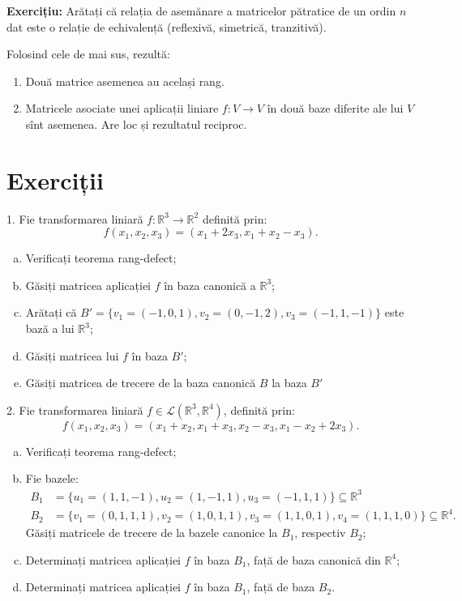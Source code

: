 \documentclass[11pt,a4paper]{article}
\newcommand\kal{\mathcal}
\newcommand\seq{\subseteq}
\newcommand\RR{\mathbb{R}}
\theoremstyle{dotless}
\theoremstyle{dotlessdr}
\begin{document}
\textbf{Exercițiu:} Arătați că relația de asemănare a matricelor pătratice
de un ordin $n$ dat este o relație de echivalență (reflexivă, simetrică, tranzitivă).

\vspace{.3cm}

Folosind cele de mai sus, rezultă:
\begin{enumerate}[(1)]
\item Două matrice asemenea au același rang.
\item Matricele asociate unei aplicații liniare $f : V \to V$ în două baze
  diferite ale lui $V$ sînt asemenea. Are loc și rezultatul reciproc.
\end{enumerate}


\section{Exerciții}
\label{sec:exc}

1. Fie transformarea liniară $f : \RR^3 \to \RR^2$ definită prin:
\[
  f(x_1, x_2, x_3) = (x_1 + 2x_3, x_1 + x_2 - x_3).
\]

\begin{enumerate}[(a)]
\item Verificați teorema rang-defect;
\item Găsiți matricea aplicației $f$ în baza canonică a $\RR^3$;
\item Arătați că $B' = \{ v_1 = (-1, 0, 1), v_2 = (0, -1, 2), v_3 = (-1, 1, -1) \}$
  este bază a lui $\RR^3$;
\item Găsiți matricea lui $f$ în baza $B'$;
\item Găsiți matricea de trecere de la baza canonică $B$ la baza $B'$
\end{enumerate}

\vspace{1cm}

2. Fie transformarea liniară $f \in \kal{L}(\RR^3, \RR^4)$, definită prin:
\[
  f(x_1, x_2, x_3) = (x_1 + x_2, x_1 + x_3, x_2 - x_3, x_1 - x_2 + 2x_3).
\]
\begin{enumerate}[(a)]
\item Verificați teorema rang-defect;
\item Fie bazele:
  \begin{align*}
    B_1 &= \{ u_1 = (1, 1, -1), u_2 = (1, -1, 1), u_3 = (-1, 1, 1) \} \seq \RR^3 \\
    B_2 &= \{ v_1 = (0, 1, 1, 1), v_2 = (1, 0, 1, 1), v_3 = (1, 1, 0, 1), v_4 = (1, 1, 1, 0) \} \seq \RR^4.
  \end{align*}
  Găsiți matricele de trecere de la bazele canonice la $B_1$, respectiv $B_2$;
\item Determinați matricea aplicației $f$ în baza $B_1$, față de baza canonică
  din $\RR^4$;
\item Determinați matricea aplicației $f$ în baza $B_1$, față de baza $B_2$.
\end{enumerate}
\end{document}
